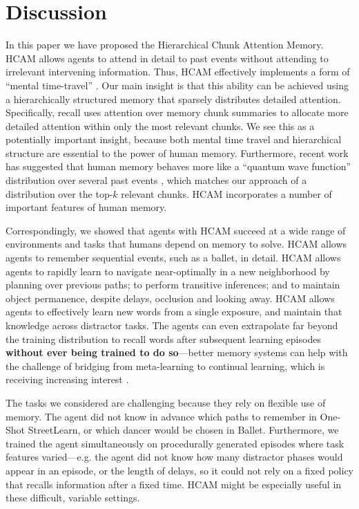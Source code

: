 \documentclass{article}
\begin{document}
\section{Discussion}

In this paper we have proposed the Hierarchical Chunk Attention Memory. HCAM allows agents to attend in detail to past events without attending to irrelevant intervening information. Thus, HCAM effectively implements a form of ``mental time-travel'' \citep{tulving1985memory}. Our main insight is that this ability can be achieved using a hierarchically structured memory that sparsely distributes detailed attention. Specifically, recall uses attention over memory chunk summaries to allocate more detailed attention within only the most relevant chunks. We see this as a potentially important insight, because both mental time travel \citep{suddendorf2009mental} and hierarchical structure \citep{hasson2015hierarchical} are essential to the power of human memory. Furthermore, recent work has suggested that human memory behaves more like a ``quantum wave function'' distribution over several past events \citep{manning2021episodic}, which matches our approach of a distribution over the top-\(k\) relevant chunks. HCAM incorporates a number of important features of human memory.

Correspondingly, we showed that agents with HCAM succeed at a wide range of environments and tasks that humans depend on memory to solve. HCAM allows agents to remember sequential events, such as a ballet, in detail. HCAM allows agents to rapidly learn to navigate near-optimally in a new neighborhood by planning over previous paths; to perform transitive inferences; and to maintain object permanence, despite delays, occlusion and looking away. HCAM allows agents to effectively learn new words from a single exposure, and maintain that knowledge across distractor tasks. The agents can even extrapolate far beyond the training distribution to recall words after subsequent learning episodes \textbf{without ever being trained to do so}---better memory systems can help with the challenge of bridging from meta-learning to continual learning, which is receiving increasing interest \citep{finn2019online,he2019task,ritter2020rapid,caccia2020online,moskvichev2021updater}.

The tasks we considered are challenging because they rely on flexible use of memory. The agent did not know in advance which paths to remember in One-Shot StreetLearn, or which dancer would be chosen in Ballet. Furthermore, we trained the agent simultaneously on procedurally generated episodes where task features varied---e.g. the agent did not know how many distractor phases would appear in an episode, or the length of delays, so it could not rely on a fixed policy that recalls information after a fixed time. HCAM might be especially useful in these difficult, variable settings.
\end{document}
